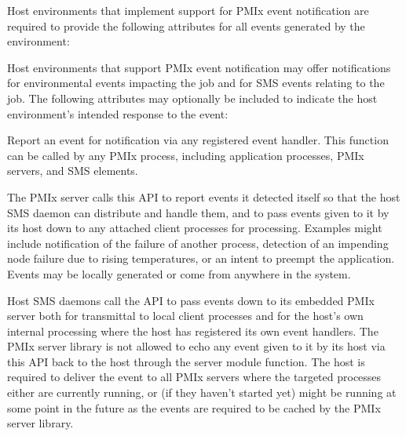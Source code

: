 
\divider

Host environments that implement support for \ac{PMIx} event notification are required to provide the following attributes for all events generated by the environment:


\reqattrend

\optattrstart
Host environments that support \ac{PMIx} event notification may offer notifications for environmental events impacting the job and for \ac{SMS} events relating to the job. The following attributes may optionally be included to indicate the host environment's intended response to the event:


\optattrend

\descr

Report an event for notification via any registered event handler. This function can be called by any \ac{PMIx} process, including application processes, \ac{PMIx} servers, and \ac{SMS} elements.

The \ac{PMIx} server calls this \ac{API} to report events it detected itself so that the host \ac{SMS} daemon can distribute and handle them, and to pass events given to it by its host down to any attached client processes for processing. Examples might include notification of the failure of another process, detection of an impending node failure due to rising temperatures, or an intent to preempt the application. Events may be locally generated or come from anywhere in the system.

Host \ac{SMS} daemons call the \ac{API} to pass events down to its embedded \ac{PMIx} server both for transmittal to local client processes and for the host's own internal processing where the host has registered its own event handlers. The \ac{PMIx} server library is not allowed to echo any event given to it by its host via this \ac{API} back to the host through the  server module function. The host is required to deliver the event to all \ac{PMIx} servers where the targeted processes either are currently running, or (if they haven't started yet) might be running at some point in the future as the events are required to be cached by the \ac{PMIx} server library.

